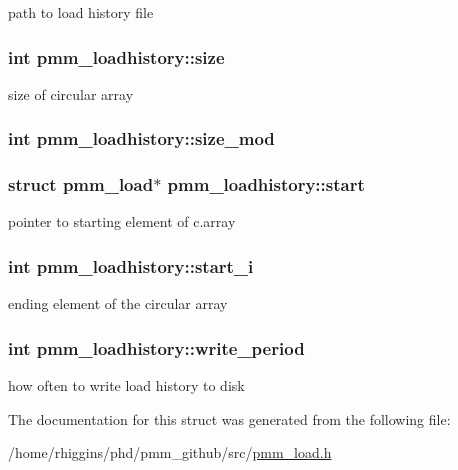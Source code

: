 path to load history file \hypertarget{structpmm__loadhistory_aa94cad9b8b853fcd64e5f5ac5dd7add1}{
\subsubsection[{size}]{\setlength{\rightskip}{0pt plus 5cm}int pmm\-\_\-loadhistory\-::size}}\label{structpmm__loadhistory_aa94cad9b8b853fcd64e5f5ac5dd7add1}
size of circular array \hypertarget{structpmm__loadhistory_ab4ba4ac36c795a0e44613fb705717d6d}{
\subsubsection[{size\-\_\-mod}]{\setlength{\rightskip}{0pt plus 5cm}int pmm\-\_\-loadhistory\-::size\-\_\-mod}}\label{structpmm__loadhistory_ab4ba4ac36c795a0e44613fb705717d6d}
\hypertarget{structpmm__loadhistory_ab707ce6e315991228742ea379694d888}{
\subsubsection[{start}]{\setlength{\rightskip}{0pt plus 5cm}struct {\bf pmm\-\_\-load}$\ast$ pmm\-\_\-loadhistory\-::start}}\label{structpmm__loadhistory_ab707ce6e315991228742ea379694d888}
pointer to starting element of c.\-array \hypertarget{structpmm__loadhistory_ab9e44fcb5987f5a6a891da336c43d213}{
\subsubsection[{start\-\_\-i}]{\setlength{\rightskip}{0pt plus 5cm}int pmm\-\_\-loadhistory\-::start\-\_\-i}}\label{structpmm__loadhistory_ab9e44fcb5987f5a6a891da336c43d213}
ending element of the circular array \hypertarget{structpmm__loadhistory_ab7ecf5a0323e3b846f120cd6ef3c7bc2}{
\subsubsection[{write\-\_\-period}]{\setlength{\rightskip}{0pt plus 5cm}int pmm\-\_\-loadhistory\-::write\-\_\-period}}\label{structpmm__loadhistory_ab7ecf5a0323e3b846f120cd6ef3c7bc2}
how often to write load history to disk 

The documentation for this struct was generated from the following file\-:\begin{DoxyCompactItemize}
\item 
/home/rhiggins/phd/pmm\-\_\-github/src/\hyperlink{pmm__load_8h}{pmm\-\_\-load.\-h}\end{DoxyCompactItemize}
